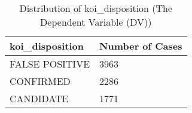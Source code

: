 \begin{table}[!htbp]
 \centering
 \caption{Distribution of koi\_disposition (The Dependent Variable (DV))}
 \label{tbl:data/koid2.csv} 
  \begin{tabular}
{| 
 p{}| 
 p{}| 
}\hline 
\textbf{koi\_disposition} &\textbf{Number of Cases} \\ \hline 
FALSE POSITIVE &3963 \\ \hline 
CONFIRMED &2286 \\ \hline 
CANDIDATE &1771 \\ \hline 
\end{tabular} 
\end{table}
